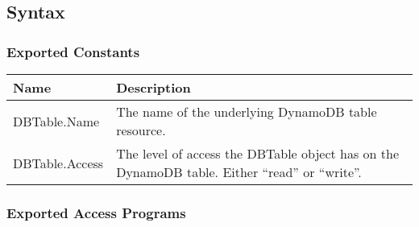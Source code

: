\documentclass[12pt, titlepage]{article}
\begin{document}
\subsection{Syntax}

\subsubsection{Exported Constants}

\begin{center}
  \begin{tabular}{p{4cm} p{12cm}}
    \hline
    \textbf{Name} & \textbf{Description} \\
    \hline
    DBTable.Name & The name of the underlying DynamoDB table resource. \\
    \hline
    DBTable.Access & The level of access the DBTable object has on
    the DynamoDB table. Either ``read'' or ``write''. \\
    \hline
  \end{tabular}
\end{center}

\subsubsection{Exported Access Programs}
\end{document}

